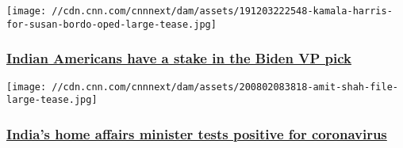 \href{/2020/08/03/opinions/kamala-harris-asian-americans-vp-pick-biden-makhija/index.html}{}

\texttt{[image: //cdn.cnn.com/cnnnext/dam/assets/191203222548-kamala-harris-for-susan-bordo-oped-large-tease.jpg]}

\hypertarget{indian-americans-have-a-stake-in-the-biden-vp-pick}{%
\subsubsection{\texorpdfstring{\href{/2020/08/03/opinions/kamala-harris-asian-americans-vp-pick-biden-makhija/index.html}{Indian
Americans have a stake in the Biden VP
pick}}{Indian Americans have a stake in the Biden VP pick}}\label{indian-americans-have-a-stake-in-the-biden-vp-pick}}

\href{/2020/08/02/india/amit-shah-india-minister-tests-positive-coronavirus-intl/index.html}{}

\texttt{[image: //cdn.cnn.com/cnnnext/dam/assets/200802083818-amit-shah-file-large-tease.jpg]}

\hypertarget{indias-home-affairs-minister-tests-positive-for-coronavirus}{%
\subsubsection{\texorpdfstring{\href{/2020/08/02/india/amit-shah-india-minister-tests-positive-coronavirus-intl/index.html}{India's
home affairs minister tests positive for
coronavirus}}{India's home affairs minister tests positive for coronavirus}}\label{indias-home-affairs-minister-tests-positive-for-coronavirus}}

